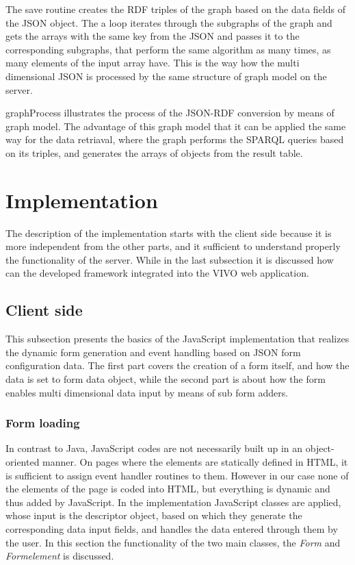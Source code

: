 The save routine creates the RDF triples of the graph based on the data fields of the JSON object. The a loop iterates through the subgraphs of the graph and gets the arrays with the same key from the JSON and passes it to the corresponding subgraphs, that perform the same algorithm as many times, as many elements of the input array have. This is the way how the multi dimensional JSON is processed by the same structure of graph model on the server. 

\figurename{graphProcess} illustrates the process of the JSON-RDF conversion by means of graph model. The advantage of this graph model that it can be applied the same way for the data retriaval, where the graph performs the SPARQL queries based on its triples, and generates the arrays of objects from the result table. 


\newpage
\section{Implementation} \label{52}

The description of the implementation starts with the client side because it is more independent from the other parts, and it sufficient to understand properly the functionality of the server. While in the last subsection it is discussed how can the developed framework integrated into the VIVO web application. 


\subsection{Client side}

This subsection presents the basics of the JavaScript implementation that realizes the dynamic form generation and event handling based on JSON form configuration data. The first part covers the creation of a form itself, and how the data is set to form data object, while the second part is about how the form enables multi dimensional data input by means of sub form adders.
 

\subsubsection{Form loading}

In contrast to Java, JavaScript codes are not necessarily built up in an object-oriented manner. On pages where the elements are statically defined in HTML, it is sufficient to assign event handler routines to them. However in our case none of the elements of the page is coded into HTML, but everything is dynamic and thus added by JavaScript. In the implementation JavaScript classes are applied, whose input is the descriptor object, based on which they generate the corresponding data input fields, and handles the data entered through them by the user. In this section the functionality of the two main classes, the \textit{Form} and \textit{Formelement} is discussed.  

